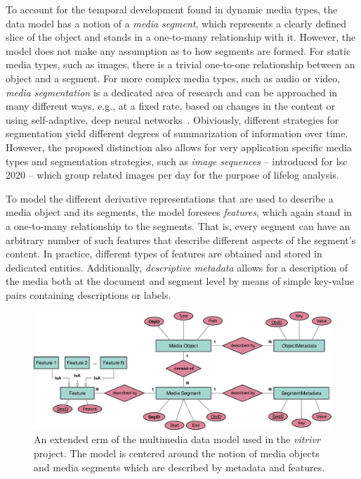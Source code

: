 To account for the temporal development found in dynamic media types, the data model has a notion of a \emph{media segment}, which represents a clearly defined slice of the object and stands in a one-to-many relationship with it. However, the model does not make any assumption as to how segments are formed. For static media types, such as images, there is a trivial one-to-one relationship between an object and a segment. For more complex media types, such as audio or video, \emph{media segmentation} is a dedicated area of research \cite{Koprinska:2001temporal} and can be approached in many different ways, e.g., at a fixed rate, based on changes in the content \cite{Foote:2000Automatic,Tsai:2016video} or using self-adaptive, deep neural networks~\cite{Souvcek:2019transnet}. Obiviously, different strategies for segmentation yield different degrees of summarization of information over time. However, the proposed distinction also allows for very application specific media types and segmentation strategies, such as \emph{image sequences} -- introduced for \acrshort{lsc} 2020 \cite{Heller:2020Interactive} -- which group related images per day for the purpose of lifelog analysis.

To model the different derivative representations that are used to describe a media object and its segments, the model foresees \emph{features}, which again stand in a one-to-many relationship to the segments. That is, every segment can have an arbitrary number of such features that describe different aspects of the segment's content. In practice, different types of features are obtained and stored in dedicated entities. Additionally, \emph{descriptive metadata} allows for a description of the media both at the document and segment level by means of simple key-value pairs containing descriptions or labels.

\begin{figure}[bt]
    \centering
    \includegraphics[width=\textwidth]{figures/erm-media-data-vitrivr}
    \caption{An extended \acrshort{erm} of the multimedia data model used in the \emph{vitrivr} project. The model is centered around the notion of media objects and media segments which are described by metadata and features.}
    \label{figure:erm_mediadata_vitrivr}
\end{figure}

